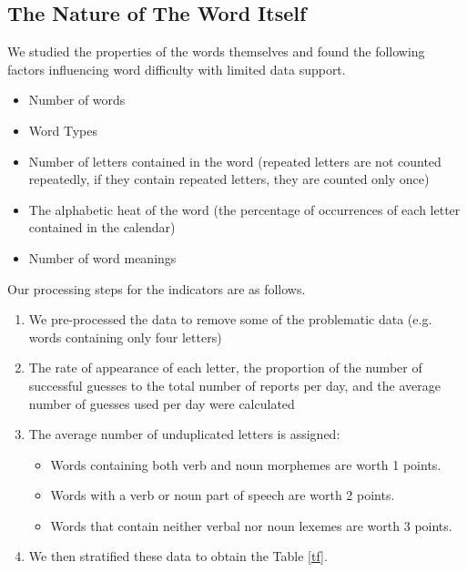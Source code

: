 \documentclass[12pt]{article}  %
\begin{document}
\subsection{The Nature of The Word Itself}
We studied the properties of the words themselves and found the following factors influencing word difficulty with limited data support.
\begin{itemize}
\item Number of words
\item Word Types
\item Number of letters contained in the word (repeated letters are not counted repeatedly, if they contain repeated letters, they are counted only once)
\item The alphabetic heat of the word (the percentage of occurrences of each letter contained in the calendar)
\item Number of word meanings
\end{itemize}
Our processing steps for the indicators are as follows.
\begin{enumerate}[Step 1]
\item We pre-processed the data to remove some of the problematic data (e.g. words containing only four letters)
\item The rate of appearance of each letter, the proportion of the number of successful guesses to the total number of reports per day, and the average number of guesses used per day were calculated
\item The average number of unduplicated letters is assigned:
\begin{itemize}
\item Words containing both verb and noun morphemes are worth 1 points.
\item Words with a verb or noun part of speech are worth 2 points.
\item Words that contain neither verbal nor noun lexemes are worth 3 points.
\end{itemize}
\item We then stratified these data to obtain the Table \ref{tf}.
\end{enumerate}
\end{document}
